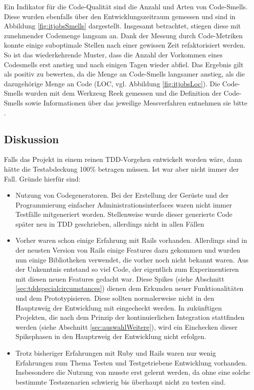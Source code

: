 Ein Indikator für die Code-Qualität sind die Anzahl und Arten von Code-Smells. Diese wurden ebenfalls über den Entwicklungszeitraum gemessen und sind in Abbildung \ref{fig:itjobsSmells} dargestellt. Insgesamt betrachtet, stiegen diese mit zunehmender Codemenge langsam an. Dank der Messung durch Code-Metriken konnte einige suboptimale Stellen nach einer gewissen Zeit refaktorisiert werden. So ist das wiederkehrende Muster, dass die Anzahl der Vorkommen eines Codesmells erst anstieg und nach einigen Tagen wieder abfiel. Das Ergebnis gilt als positiv zu bewerten, da die Menge an Code-Smells langsamer anstieg, als die dazugehörige Menge an Code (LOC, vgl. Abbildung \ref{fig:itjobsLoc}). Die Code-Smells wurden mit dem Werkzeug Reek gemessen und die Definition der Code-Smells sowie Informationen über das jeweilige Messverfahren entnehmen sie bitte \citep{kevin_rutherford_code_2010}.

\subsection*{Diskussion}
Falls das Projekt in einem reinen TDD-Vorgehen entwickelt worden wäre, dann hätte die Testabdeckung 100\% betragen müssen. Ist war aber nicht immer der Fall. Gründe hierfür sind:
\begin{itemize}
 \item Nutzung von Codegeneratoren. Bei der Erstellung der Gerüste und der Programmierung einfacher Administrationsinterfaces waren nicht immer Testfälle mitgeneriert worden. Stellenweise wurde dieser generierte Code später neu in TDD geschrieben, allerdings nicht in allen Fällen
 \item Vorher waren schon einige Erfahrung mit Rails vorhanden. Allerdings sind in der neusten Version von Rails einige Features dazu gekommen und wurden nun einige Bibliotheken verwendet, die vorher noch nicht bekannt waren. Aus der Unkenntnis entstand so viel Code, der eigentlich zum Experimentieren mit diesen neuen Features gedacht war. Diese Spikes (siehe Abschnitt \ref{sec:tddspecialcircumstances}) dienen dem Erkunden neuer Funktionalitäten und dem Prototypisieren. Diese sollten normalerweise nicht in den Hauptzweig der Entwicklung mit eingecheckt werden. In zukünftigen Projekten, die nach dem Prinzip der kontinuierlichen Integration stattfinden werden (siehe Abschnitt \ref{sec:auswahlWeitere}), wird ein Einchecken dieser Spikephasen in den Hauptzweig der Entwicklung nicht erfolgen.
 \item Trotz bisheriger Erfahrungen mit Ruby und Rails waren nur wenig Erfahrungen zum Thema Testen und Testgetriebene Entwicklung vorhanden. Insbesondere die Nutzung von  musste erst gelernt werden, da ohne eine solche bestimmte Testszenarien schwierig bis überhaupt nicht zu testen sind.
\end{itemize}


